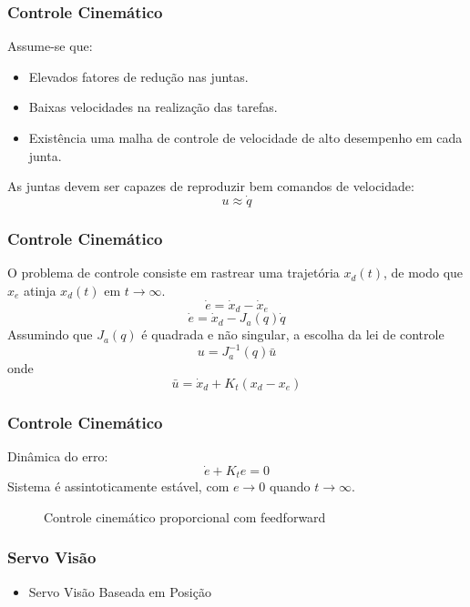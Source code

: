 \documentclass{beamer}
\begin{document}
\begin{frame}
\frametitle{Controle Cinemático}
Assume-se que:
\begin{itemize}
\item Elevados fatores de redução nas juntas.
\item Baixas velocidades na realização das tarefas.
\item Existência uma malha de controle de velocidade de alto desempenho em cada junta.
\end{itemize}
As juntas devem ser capazes de reproduzir bem comandos de velocidade:
\[ {u} \approx \dot{{q}}\]
\end{frame}

\begin{frame}
\frametitle{Controle Cinemático}
O problema de controle consiste em rastrear uma trajetória ${x}_d(t)$, de modo que  ${x}_e$ atinja ${x}_d(t)$ em $t \to \infty$.
\begin{equation}
{\dot{e}} = {\dot{x}}_d - {\dot{x}_e}
\end{equation}
\begin{equation}
{\dot{e}} = {\dot{x}}_d - {J}_a({q})\dot{{q}}
\end{equation}
Assumindo que ${J}_a({q})$ é quadrada e não singular, a escolha da lei de controle
\begin{equation}
{u} = {J}_a^{-1}({q})\bar{{u}}
\end{equation}
onde
\begin{equation}
\bar{{u}} = \dot{{x}}_d + {K_t} ({x}_d - {x}_e)
\end{equation}
\end{frame}

\begin{frame}
\frametitle{Controle Cinemático}
Dinâmica do erro:
\begin{equation}
\dot{{e}} + {K_t} {e} = 0
\end{equation}
Sistema é assintoticamente estável, com $e \rightarrow 0$ quando $t \to \infty$.
\begin{figure}[h!]
\centering {}
\caption{Controle cinemático proporcional com feedforward}
\label{fig:controlecinematico}
\end{figure}
\end{frame}

\begin{frame}
\frametitle{Servo Visão}
\begin{itemize}
\item Servo Visão Baseada em Posição
\end{itemize}
\end{frame}
\end{document}
